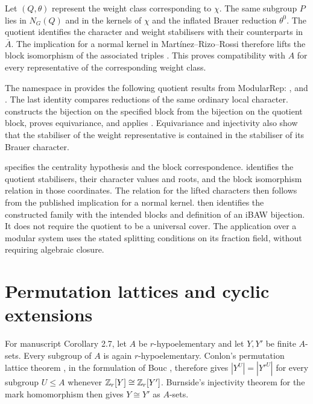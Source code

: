 Let $(Q,\theta)$ represent the weight class corresponding to
$\chi$. The same subgroup $P$
lies in $N_G(Q)$ and in the kernels of $\chi$ and the inflated
Brauer reduction $\theta^0$. The quotient identifies the
character and weight stabilisers with their counterparts in
$\overline A$. The implication for a normal kernel in
Mart\'inez--Rizo--Rossi therefore lifts the block isomorphism of
the associated triples \cite[Lemma~3.14]{MartinezRizoRossi2026}.
This proves compatibility with $A$ for every representative of
the corresponding weight class.

\begin{implementation}
The  namespace in
 provides the following quotient results from ModularRep:
,  and
. The last identity compares
reductions of the same ordinary local character.
 constructs the bijection
on the specified block from the bijection on the quotient block,
proves equivariance, and applies .
Equivariance and injectivity also show that the stabiliser of the
weight representative is contained in the stabiliser of its Brauer
character.

 specifies the centrality hypothesis and
the block correspondence. 
identifies the quotient stabilisers, their character values and
roots, and the block isomorphism relation in those coordinates.
The relation for the lifted characters then follows from the published
implication for a normal kernel.
 then identifies
the constructed family with the intended blocks and
definition of an iBAW bijection. It does not require the quotient to
be a universal cover. The application over a modular system uses the stated splitting
conditions on its fraction field, without requiring algebraic closure.
\end{implementation}

\section{Permutation lattices and cyclic extensions}

For manuscript Corollary 2.7, let $A$ be $r$-hypoelementary and
let $Y,Y'$ be finite $A$-sets.
Every subgroup of $A$ is again $r$-hypoelementary. Conlon's
permutation lattice theorem \cite{Conlon1968}, in the formulation
of Bouc \cite[Theorem~3.5.5]{Bouc2000}, therefore gives $|Y^U|=|Y'^U|$ for every subgroup $U\leq A$ whenever $\mathbb Z_r[Y]\cong\mathbb Z_r[Y']$. Burnside's injectivity theorem for the mark homomorphism
\cite[Theorem~2.3.2]{Bouc2000} then gives $Y\cong Y'$ as $A$-sets.

